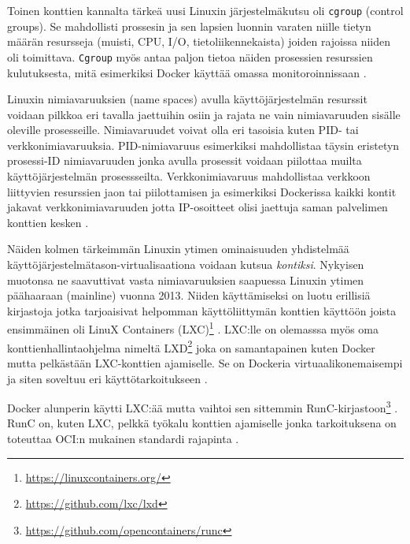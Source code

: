 \documentclass[finnish]{tktltiki2}
\theoremstyle{definition}
\theoremstyle{remark}
\begin{document}
Toinen konttien kannalta tärkeä uusi Linuxin järjestelmäkutsu oli \texttt{cgroup} (control groups). Se mahdollisti prossesin ja sen lapsien luonnin varaten niille tietyn määrän resursseja (muisti, CPU, I/O, tietoliikennekaista) joiden rajoissa niiden oli toimittava. \texttt{Cgroup} myös antaa paljon tietoa näiden prosessien resurssien kulutuksesta, mitä esimerkiksi Docker käyttää omassa monitoroinnissaan \cite{docker}.

Linuxin nimiavaruuksien (name spaces) avulla käyttöjärjestelmän resurssit voidaan pilkkoa eri tavalla jaettuihin osiin ja rajata ne vain nimiavaruuden sisälle oleville prosesseille. Nimiavaruudet voivat olla eri tasoisia kuten PID- tai verkkonimiavaruuksia. PID-nimiavaruus esimerkiksi mahdollistaa täysin eristetyn prosessi-ID nimiavaruuden jonka avulla prosessit voidaan piilottaa muilta käyttöjärjestelmän prosessseilta. Verkkonimiavaruus mahdollistaa verkkoon liittyvien resurssien jaon tai piilottamisen ja esimerkiksi Dockerissa kaikki kontit jakavat verkkonimiavaruuden jotta IP-osoitteet olisi jaettuja saman palvelimen konttien kesken \cite{containers-vs-vms}.

Näiden kolmen tärkeimmän Linuxin ytimen ominaisuuden yhdistelmää käyttöjärjestelmätason-virtualisaationa voidaan kutsua \textit{kontiksi}. Nykyisen muotonsa ne saavuttivat vasta nimiavaruuksien saapuessa Linuxin ytimen päähaaraan (mainline) vuonna 2013. Niiden käyttämiseksi on luotu erillisiä kirjastoja jotka tarjoaisivat helpomman käyttöliittymän konttien käyttöön joista ensimmäinen oli LinuX Containers (LXC)\footnote{\url{https://linuxcontainers.org/}} \cite{docker}. LXC:lle on olemasssa myös oma konttienhallintaohjelma nimeltä LXD\footnote{\url{https://github.com/lxc/lxd}} joka on samantapainen kuten Docker mutta pelkästään LXC-konttien ajamiselle. Se on Dockeria virtuaalikonemaisempi ja siten soveltuu eri käyttötarkoitukseen \cite{lxd}.

Docker alunperin käytti LXC:ää mutta vaihtoi sen sittemmin RunC-kirjastoon\footnote{\url{https://github.com/opencontainers/runc}} \cite{introducing-runc}. RunC on, kuten LXC, pelkkä työkalu konttien ajamiselle jonka tarkoituksena on toteuttaa OCI:n mukainen standardi rajapinta \cite{runc-blog}.
\end{document}
